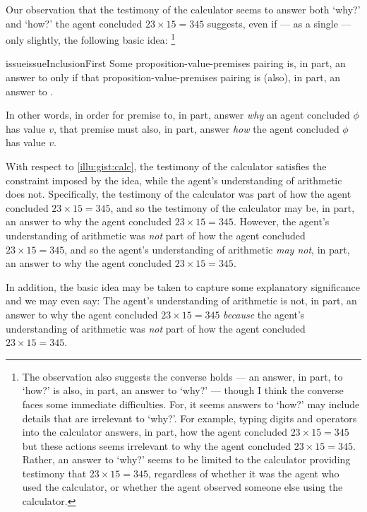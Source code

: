 \begin{note}
  Our observation that the testimony of the calculator seems to answer both `why?' and `how?' the agent concluded \(23 \times 15 = 345\) suggests, even if --- as a single  --- only slightly, the following basic idea:%
  \footnote{
    The observation also suggests the converse holds --- an answer, in part, to `how?' is also, in part, an answer to `why?' --- though I think the converse faces some immediate difficulties.
    For, it seems answers to `how?' may include details that are irrelevant to `why?'.
    For example, typing digits and operators into the calculator answers, in part, how the agent concluded \(23 \times 15 = 345\) but these actions seems irrelevant to why the agent concluded \(23 \times 15 = 345\).
    Rather, an answer to `why?' seems to be limited to the calculator providing testimony that \(23 \times 15 = 345\), regardless of whether it was the agent who used the calculator, or whether the agent observed someone else using the calculator.
  }

  \begin{restatable}[\issueInclusion{}]{issue}{issueInclusionFirst}
    \label{issue:why-inc-in-how}
    Some proposition-value-premises pairing is, in part, an answer to \qWhy{} only if that proposition-value-premises pairing is (also), in part, an answer to \qHow{}.
  \end{restatable}

  In other words, in order for premise to, in part, answer \emph{why} an agent concluded \(\phi\) has value \(v\), that premise must also, in part, answer \emph{how} the agent concluded \(\phi\) has value \(v\).

  With respect to \autoref{illu:gist:calc}, the testimony of the calculator satisfies the constraint imposed by the idea, while the agent's understanding of arithmetic does not.
  Specifically, the testimony of the calculator was part of how the agent concluded \(23 \times 15 = 345\), and so the testimony of the calculator may be, in part, an answer to why the agent concluded \(23 \times 15 = 345\).
  However, the agent's understanding of arithmetic was \emph{not} part of how the agent concluded \(23 \times 15 = 345\), and so the agent's understanding of arithmetic \emph{may not}, in part, an answer to why the agent concluded \(23 \times 15 = 345\).

  In addition, the basic idea may be taken to capture some explanatory significance and we may even say:
  The agent's understanding of arithmetic is not, in part, an answer to why the agent concluded \(23 \times 15 = 345\) \emph{because} the agent's understanding of arithmetic was \emph{not} part of how the agent concluded \(23 \times 15 = 345\).
\end{note}

